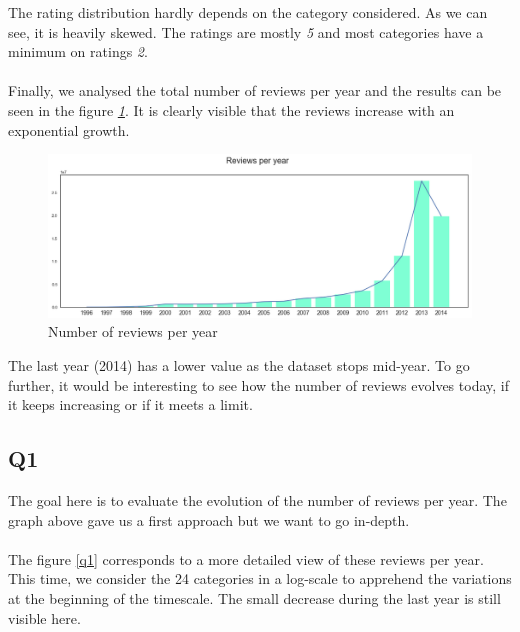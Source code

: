 \documentclass[11pt]{article}
\begin{document}
The rating distribution hardly depends on the category considered. As we can see, it is heavily skewed. The ratings are mostly {\em 5} and most categories have a minimum on ratings {\em 2}.

\paragraph{}
Finally, we analysed the total number of reviews per year and the results can be seen in the figure {\em\ref{reviews_temp}}. It is clearly visible that the reviews increase with an exponential growth.

\begin{figure}[!h]
\centering
\includegraphics[width=1\linewidth]{reviews_temp.png}
\caption{Number of reviews per year}
\label{reviews_temp}
\end{figure}

The last year (2014) has a lower value as the dataset stops mid-year. To go further, it would be interesting to see how the number of reviews evolves today, if it keeps increasing or if it meets a limit.

\subsection{Q1}

The goal here is to evaluate the evolution of the number of reviews per year. The graph above gave us a first approach but we want to go in-depth. 

\paragraph{}
The figure \ref{q1} corresponds to a more detailed view of these reviews per year. This time, we consider the 24 categories in a log-scale to apprehend the variations at the beginning of the timescale. The small decrease during the last year is still visible here.
\end{document}
